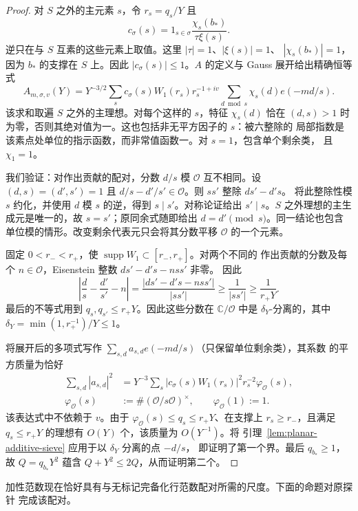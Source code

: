 \documentclass[11pt,a4paper]{article}
\numberwithin{equation}{section}
\numberwithin{figure}{section}
\theoremstyle{definition}
\theoremstyle{remark}
\begin{document}
\begin{proof}
对 $S$ 之外的主元素 $s$，令 $r_s=q_s/Y$ 且
\[
 c_\sigma(s)=1_{s\in\sigma}\frac{\chi_s(b_*)}{\tau\xi(s)}.
\]
逆只在与 $S$ 互素的这些元素上取值。这里 $|\tau|=1$、$|\xi(s)|=1$、
$|\chi_s(b_*)|=1$，因为 $b_*$ 的支撑在 $S$ 上。因此
$|c_\sigma(s)|\le1$。$A$ 的定义与 Gauss 展开给出精确恒等式
\[
 A_{m,\sigma,v}(Y)
 =Y^{-3/2}\sum_s c_\sigma(s)W_1(r_s)r_s^{-1+iv}
       \sum_{d\bmod s}\chi_s(d)e(-md/s).
\]
该求和取遍 $S$ 之外的主理想。对每个这样的 $s$，特征 $\chi_s(d)$ 恰在
$(d,s)>1$ 时为零，否则其绝对值为一。这也包括非无平方因子的 $s$：被六整除的
局部指数是该素点处单位的指示函数，而非常值函数一。对 $s=1$，包含单个剩余类，
且 $\chi_1=1$。

我们验证：对作出贡献的配对，分数 $d/s$ 模 $\mathcal O$ 互不相同。设
$(d,s)=(d',s')=1$ 且 $d/s-d'/s'\in\mathcal O$。则 $ss'$ 整除 $ds'-d's$。
将此整除性模 $s$ 约化，并使用 $d$ 模 $s$ 的逆，得到 $s\mid s'$。对称论证给出
$s'\mid s$。$S$ 之外理想的主生成元是唯一的，故 $s=s'$；原同余式随即给出
$d=d'\pmod s$。同一结论也包含单位模的情形。改变剩余代表元只会将其分数平移
$\mathcal O$ 的一个元素。

固定 $0<r_-<r_+$，使 $\operatorname{supp}W_1\subset[r_-,r_+]$。对两个不同的
作出贡献的分数及每个 $n\in\mathcal O$，Eisenstein 整数 $ds'-d's-nss'$ 非零。
因此
\[
 \left|\frac d s-\frac{d'}{s'}-n\right|
 =\frac{|ds'-d's-nss'|}{|ss'|}
 \ge\frac1{|ss'|}\ge\frac1{r_+Y}.
\]
最后的不等式用到 $q_s,q_{s'}\le r_+Y$。因此这些分数在 $\mathbb C/\mathcal O$
中是 $\delta_Y$-分离的，其中 $\delta_Y=\min(1,r_+^{-1})/Y\le1$。

将展开后的多项式写作 $\sum_{s,d}a_{s,d}e(-md/s)$（只保留单位剩余类），其系数
的平方质量为恰好
\[
 \begin{split}
 \sum_{s,d}|a_{s,d}|^2
 &=Y^{-3}\sum_s |c_\sigma(s)W_1(r_s)|^2r_s^{-2}
       \varphi_{\mathcal O}(s),\\
 \varphi_{\mathcal O}(s)
 &:=\#(\mathcal O/s\mathcal O)^\times,\qquad
 \varphi_{\mathcal O}(1):=1.
 \end{split}
\]
该表达式中不依赖于 $v$。由于
$\varphi_{\mathcal O}(s)\le q_s\le r_+Y$、在支撑上 $r_s\ge r_-$，且满足
$q_s\le r_+Y$ 的理想有 $O(Y)$ 个，该质量为 $O(Y^{-1})$。将
引理~\ref{lem:planar-additive-sieve} 应用于以 $\delta_Y$ 分离的点 $-d/s$，
即证明了第一个界。最后 $q_{b_*}\ge1$，故 $Q=q_{b_*}Y^2$ 蕴含
$Q+Y^2\le2Q$，从而证明第二个。
\end{proof}

加性范数现在恰好具有与无标记完备化行范数配对所需的尺度。下面的命题对原探针
完成该配对。
\end{document}
